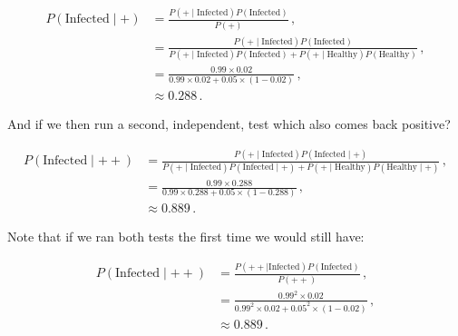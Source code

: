 \begin{equation}\label{eq:stats:Bayes:medical_test_1}
\begin{split}
P\left(\text{Infected} \mid +\right) &= \frac{P\left(+ \mid \text{Infected}\right) P\left(\text{Infected}\right)}{P\left(+\right)}\,, \\
 &= \frac{P\left(+ \mid \text{Infected}\right) P\left(\text{Infected}\right)}{
P\left(+ \mid \text{Infected}\right)P\left(\text{Infected}\right) + P\left(+ \mid \text{Healthy}\right)P\left(\text{Healthy}\right)}\,, \\
&= \frac{\num{0.99} \times \num{0.02}}{\num{0.99} \times \num{0.02} + \num{0.05} \times \left(1-\num{0.02}\right)}\,, \\
&\approx \num{0.288}\,.
\end{split}
\end{equation}

\noindent And if we then run a second, independent, test which also comes back positive?

\begin{equation}\label{eq:stats:Bayes:medical_test_2}
\begin{split}
P\left(\text{Infected} \mid ++\right) &= \frac{P\left(+ \mid \text{Infected}\right) P\left(\text{Infected} \mid +\right)}{
P\left(+ \mid \text{Infected}\right)P\left(\text{Infected} \mid +\right) + P\left(+ \mid \text{Healthy}\right)P\left(\text{Healthy} \mid +\right)}\,, \\
&= \frac{\num{0.99} \times \num{0.288}}{\num{0.99} \times \num{0.288} + \num{0.05} \times \left(1-\num{0.288}\right)}\,, \\
&\approx \num{0.889}\,.
\end{split}
\end{equation}

\noindent Note that if we ran both tests the first time we would still have:

\begin{equation}\label{eq:stats:Bayes:medical_test_3}
\begin{split}
P\left(\text{Infected} \mid ++\right) &= \frac{P\left(++ \mid \text{Infected}\right) P\left(\text{Infected}\right)}{P\left(++\right)}\,, \\
&= \frac{\num{0.99}^{2} \times \num{0.02}}{\num{0.99}^{2} \times \num{0.02} + \num{0.05}^{2} \times \left(1-\num{0.02}\right)}\,, \\
&\approx \num{0.889}\,.
\end{split}
\end{equation}

